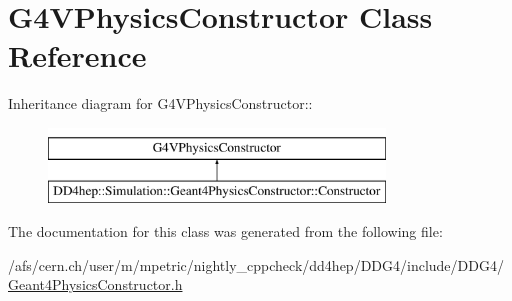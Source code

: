 \hypertarget{class_g4_v_physics_constructor}{
\section{G4VPhysicsConstructor Class Reference}
\label{class_g4_v_physics_constructor}
}
Inheritance diagram for G4VPhysicsConstructor::\begin{figure}[H]
\begin{center}
\leavevmode
\includegraphics[height=2cm]{class_g4_v_physics_constructor}
\end{center}
\end{figure}


The documentation for this class was generated from the following file:\begin{DoxyCompactItemize}
\item 
/afs/cern.ch/user/m/mpetric/nightly\_\-cppcheck/dd4hep/DDG4/include/DDG4/\hyperlink{_geant4_physics_constructor_8h}{Geant4PhysicsConstructor.h}\end{DoxyCompactItemize}
